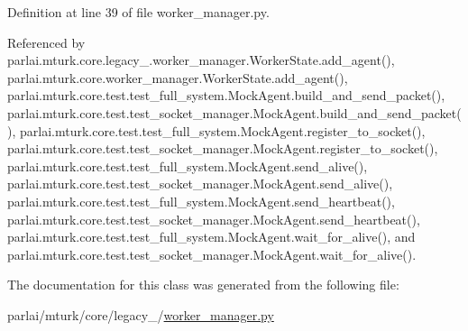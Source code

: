 Definition at line 39 of file worker\+\_\+manager.\+py.



Referenced by parlai.\+mturk.\+core.\+legacy\+\_.\+worker\+\_\+manager.\+Worker\+State.\+add\+\_\+agent(), parlai.\+mturk.\+core.\+worker\+\_\+manager.\+Worker\+State.\+add\+\_\+agent(), parlai.\+mturk.\+core.\+test.\+test\+\_\+full\+\_\+system.\+Mock\+Agent.\+build\+\_\+and\+\_\+send\+\_\+packet(), parlai.\+mturk.\+core.\+test.\+test\+\_\+socket\+\_\+manager.\+Mock\+Agent.\+build\+\_\+and\+\_\+send\+\_\+packet(), parlai.\+mturk.\+core.\+test.\+test\+\_\+full\+\_\+system.\+Mock\+Agent.\+register\+\_\+to\+\_\+socket(), parlai.\+mturk.\+core.\+test.\+test\+\_\+socket\+\_\+manager.\+Mock\+Agent.\+register\+\_\+to\+\_\+socket(), parlai.\+mturk.\+core.\+test.\+test\+\_\+full\+\_\+system.\+Mock\+Agent.\+send\+\_\+alive(), parlai.\+mturk.\+core.\+test.\+test\+\_\+socket\+\_\+manager.\+Mock\+Agent.\+send\+\_\+alive(), parlai.\+mturk.\+core.\+test.\+test\+\_\+full\+\_\+system.\+Mock\+Agent.\+send\+\_\+heartbeat(), parlai.\+mturk.\+core.\+test.\+test\+\_\+socket\+\_\+manager.\+Mock\+Agent.\+send\+\_\+heartbeat(), parlai.\+mturk.\+core.\+test.\+test\+\_\+full\+\_\+system.\+Mock\+Agent.\+wait\+\_\+for\+\_\+alive(), and parlai.\+mturk.\+core.\+test.\+test\+\_\+socket\+\_\+manager.\+Mock\+Agent.\+wait\+\_\+for\+\_\+alive().



The documentation for this class was generated from the following file\+:\begin{DoxyCompactItemize}
\item 
parlai/mturk/core/legacy\+\_/\hyperlink{legacy__2018_2worker__manager_8py}{worker\+\_\+manager.\+py}\end{DoxyCompactItemize}
